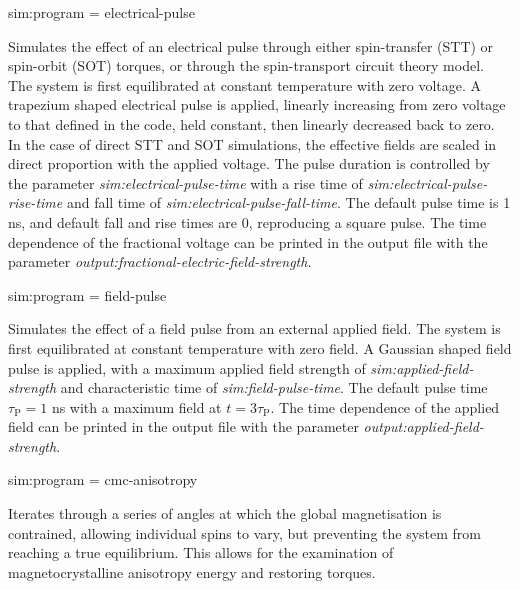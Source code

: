{\zicf sim:program = electrical-pulse}
Simulates the effect of an electrical pulse through either spin-transfer (STT) or
spin-orbit (SOT) torques, or through the spin-transport circuit theory model. The
system is first equilibrated at constant temperature with zero voltage. A
trapezium shaped electrical pulse is applied, linearly increasing from zero
voltage to that defined in the code, held constant, then linearly decreased back
to zero. In the case of direct STT and SOT simulations, the effective fields are
scaled in direct proportion with the applied voltage. The pulse duration is
controlled by the parameter \textit{sim:electrical-pulse-time}
with a rise time of \textit{sim:electrical-pulse-rise-time} and fall time of
\textit{sim:electrical-pulse-fall-time}. The default pulse time is 1 ns, and
default fall and rise times are 0, reproducing a square pulse. The time
dependence of the fractional voltage can be printed in the output file with the
parameter \textit{output:fractional-electric-field-strength}.

{\zicf sim:program = field-pulse}
Simulates the effect of a field pulse from an external applied field. The
system is first equilibrated at constant temperature with zero field. A
Gaussian shaped field pulse is applied, with a maximum applied field strength of
\textit{sim:applied-field-strength} and characteristic time of
\textit{sim:field-pulse-time}. The default pulse time $\tau_\mathrm{P} = 1$ ns
with a maximum field at $t = 3\tau_\mathrm{P}$. The time dependence of the
applied field can be printed in the output file with the parameter
\textit{output:applied-field-strength}.

{\zicf sim:program = cmc-anisotropy} Iterates through a series of angles at which the global magnetisation is contrained, allowing individual spins to vary, but preventing the system from reaching a true equilibrium. This allows for the examination of magnetocrystalline anisotropy energy and restoring torques.

